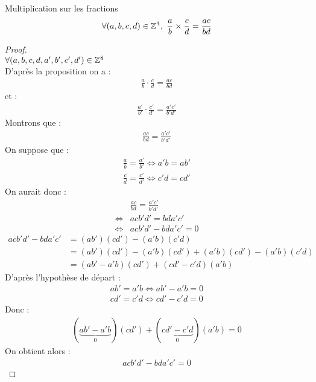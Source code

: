 \begin{proposition}{Multiplication sur les fractions}
	\begin{align*}
		\forall (a, b, c, d) \in \mathbb{Z}^4,\ \frac{a}{b} \times \frac{c}{d} = \frac{ac}{bd}
	\end{align*}
\end{proposition}
\begin{proof}~
	\\
	$\forall (a, b, c, d, a', b', c', d') \in \mathbb{Z}^8$\\
	D'après la proposition on a :
	\begin{align*}
		\frac{a}{b} \cdot \frac{c}{d} = \frac{ac}{bd}
	\end{align*}
	et :
	\begin{align*}
		\frac{a'}{b'} \cdot \frac{c'}{d'} = \frac{a'c'}{b'd'}
	\end{align*}
	Montrons que :
	\begin{align*}
		\frac{ac}{bd} = \frac{a'c'}{b'd'}
	\end{align*}
	On suppose que : 
	\begin{align*}
		\frac{a}{b} = \frac{a'}{b'} \iff a'b = ab' \\
		\frac{c}{d} = \frac{c'}{d'} \iff c'd = cd'
	\end{align*}
	On aurait donc :
	\begin{align*}
		&\frac{ac}{bd} = \frac{a'c'}{b'd'} \\
		\iff &acb'd' = bda'c' \\
		\iff &acb'd' - bda'c' = 0
	\end{align*}
	\begin{align*}
		acb'd' - bda'c' &= (ab')(cd') - (a'b)(c'd) \\
		&= (ab')(cd') - (a'b)(cd') + (a'b)(cd') - (a'b)(c'd) \\
		&= (ab' - a'b)(cd') + (cd' - c'd)(a'b)
	\end{align*}
	D'après l'hypothèse de départ :
	\begin{align*}
		ab' = a'b \iff ab' - a'b = 0 \\
		cd' = c'd \iff cd' - c'd = 0
	\end{align*}
	Donc :
	\begin{align*}
		(\underbrace{ab' - a'b}_0)(cd') + (\underbrace{cd' - c'd}_0)(a'b) = 0
	\end{align*}
	On obtient alors :
	\begin{align*}
		acb'd' - bda'c' = 0
	\end{align*}
\end{proof}
